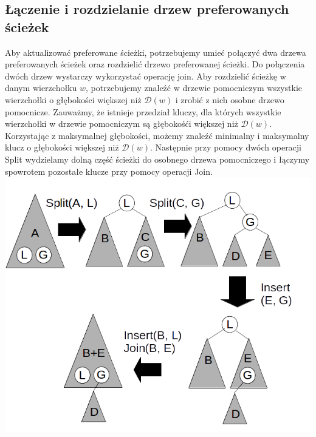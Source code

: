 \documentclass[declaration,shortabstract]{iithesis}
\theoremstyle{remark}
\theoremstyle{plain}
\theoremstyle{plain}
\theoremstyle{plain}
\begin{document}
\subsection{Łączenie i rozdzielanie drzew preferowanych ścieżek}
Aby aktualizować preferowane ścieżki, potrzebujemy umieć połączyć dwa drzewa preferowanych ścieżek oraz rozdzielić drzewo preferowanej ścieżki. Do połączenia dwóch drzew wystarczy wykorzystać operację join. Aby rozdzielić ścieżkę w danym wierzchołku $w$, potrzebujemy znaleźć w drzewie pomocniczym wszystkie wierzchołki o głębokości większej niż \(\mathcal{D}(w)\) i zrobić z nich osobne drzewo pomocnicze. Zauważmy, że istnieje przedział kluczy, dla których wszystkie wierzchołki w drzewie pomocniczym są głębokośći większej niż \(\mathcal{D}(w)\). Korzystając z maksymalnej głębokości, możemy znaleźć minimalny i maksymalny klucz o głębokości większej niż \(\mathcal{D}(w)\). Następnie przy pomocy dwóch operacji Split wydzielamy dolną część ścieżki do osobnego drzewa pomocniczego i łączymy spowrotem pozostałe klucze przy pomocy operacji Join.\\
\includegraphics[scale=0.5]{rozdzielanie.png} 
\end{document}
